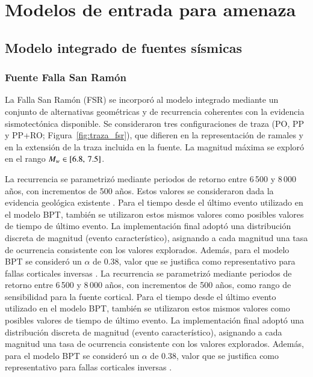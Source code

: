 \section{Modelos de entrada para amenaza}
\label{sec:meto_entradas_amenaza}

\subsection{Modelo integrado de fuentes sísmicas}
\label{sec:meto_fuentes}

\subsubsection{Fuente Falla San Ramón}
\label{sec:meto_fsr}

La Falla San Ramón (FSR) se incorporó al modelo integrado mediante un conjunto de alternativas geométricas y de recurrencia coherentes con la evidencia sismotectónica disponible. Se consideraron tres configuraciones de traza (PO, PP y PP+RO; Figura~\ref{fig:traza_fsr}), que difieren en la representación de ramales y en la extensión de la traza incluida en la fuente. La magnitud máxima se exploró en el rango $M_w{} \in [6.8,\,7.5]$.

\ifincludeprivatedata
La recurrencia se parametrizó mediante periodos de retorno entre 6\,500 y 8\,000 años, con incrementos de 500 años. Estos valores se consideraron dada la evidencia geológica existente \cite{campillay2025san}. Para el tiempo desde el último evento utilizado en el modelo BPT, también se utilizaron estos mismos valores como posibles valores de tiempo de último evento. La implementación final adoptó una distribución discreta de magnitud (evento característico), asignando a cada magnitud una tasa de ocurrencia consistente con los valores explorados. Además, para el modelo BPT se consideró un $\alpha$ de 0.38, valor que se justifica como representativo para fallas corticales inversas \cite{MatthewsEllsworthReasenberg2002}.
\else
La recurrencia se parametrizó mediante periodos de retorno entre 6\,500 y 8\,000 años, con incrementos de 500 años, como rango de sensibilidad para la fuente cortical. Para el tiempo desde el último evento utilizado en el modelo BPT, también se utilizaron estos mismos valores como posibles valores de tiempo de último evento. La implementación final adoptó una distribución discreta de magnitud (evento característico), asignando a cada magnitud una tasa de ocurrencia consistente con los valores explorados. Además, para el modelo BPT se consideró un $\alpha$ de 0.38, valor que se justifica como representativo para fallas corticales inversas \cite{MatthewsEllsworthReasenberg2002}.
\fi

